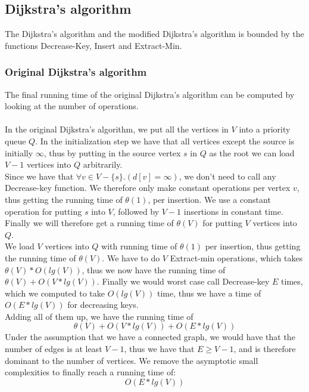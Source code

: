 \documentclass[11pt]{article}
\begin{document}
\subsection{Dijkstra's algorithm}
The Dijkstra's algorithm and the modified Dijkstra's algorithm is bounded by the functions Decrease-Key, Insert and Extract-Min.
\subsubsection{Original Dijkstra's algorithm}
\label{sec:clever}
The final running time of the original Dijkstra's algorithm can be computed by looking at the number of operations.\\\\
In the original Dijkstra's algorithm, we put all the vertices in $V$ into a priority queue $Q$. In the initialization step we have that all vertices except the source is initially $\infty$, thus by putting in the source vertex $s$ in $Q$ as the root we can load $V-1$ vertices into $Q$ arbitrarily.\\ 

\noindent Since we have that $\forall v \in V-\{s\}. (d[v] = \infty)$, we don't need to call any Decrease-key function. We therefore only make constant operations per vertex $v$, thus getting the running time of $\theta(1)$, per insertion. We use a constant operation for putting $s$ into $V$, followed by $V-1$ insertions in constant time. Finally we will therefore get a running time of $\theta(V)$ for putting $V$ vertices into $Q$.\\

\noindent We load $V$ vertices into $Q$ with running time of $\theta(1)$ per insertion, thus getting the running time of $\theta(V)$. We have to do $V$ Extract-min operations, which takes $\theta(V) * O(lg(V))$, thus we now have the running time of $\theta(V) + O(V*lg(V))$. Finally we would worst case call Decrease-key $E$ times, which we computed to take $O(lg(V))$ time, thus we have a time of $O(E*lg(V))$ for decreasing keys.\\

\noindent Adding all of them up, we have the running time of $$\theta(V) + O(V*lg(V)) + O(E*lg(V))$$
\newpage
\noindent Under the assumption that we have a connected graph, we would have that the number of edges is at least $V-1$, thus we have that $E \geq V-1$, and is therefore dominant to the number of vertices.  We remove the asymptotic small complexities to finally reach a running time of:
$$O(E*lg(V))$$
\end{document}
